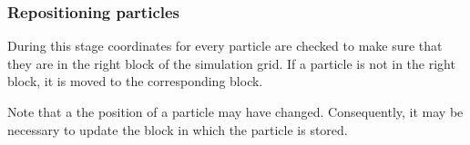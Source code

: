 \subsubsection{Repositioning particles}

During this stage coordinates for every particle are checked to make sure that
they are in the right block of the simulation grid. If a particle is not in the
right block, it is moved to the corresponding block.

Note that a the position of a particle may have changed. Consequently, it
may be necessary to update the block in which the particle is stored.

